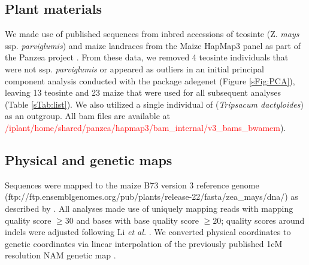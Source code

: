 \documentclass{pnastwo}
\newcommand{\jri}[1]{\textcolor{red}{\scriptsize #1}}
\begin{document}
\begin{article}
\begin{materials}
\subsection{Plant materials}
We made use of published sequences from inbred accessions of teosinte (Z. \emph{mays} ssp. \emph{parviglumis}) and maize landraces from the Maize HapMap3 panel as part of the Panzea project  \cite{chia2012, lemmon2014, hapmap3}. 
From these data, we removed 4 teosinte individuals that were not ssp. \emph{parviglumis} or appeared as outliers in an initial principal component analysis conducted with the package adegenet \cite{jombart2011} (Figure \ref{sFig:PCA}), leaving 13 teosinte and 23 maize that were used for all subsequent analyses (Table \ref{sTab:list}). We also utilized a single individual of (\emph{Tripsacum dactyloides}) as an outgroup.  All bam files are available at \textcolor{red}{/iplant/home/shared/panzea/hapmap3/bam\_internal/v3\_bams\_bwamem}).



\subsection{Physical and genetic maps}
Sequences were mapped to the maize B73 version 3 reference genome \cite{schnable2009} (ftp://ftp.ensemblgenomes.org/pub/plants/release-22/fasta/zea\_mays/dna/) as described by \cite{hapmap3}. All analyses made use of uniquely mapping reads with mapping quality score $\geq  30$ and bases with base quality score $\geq 20$; quality scores around indels were adjusted following Li \emph{et al.} \cite{li2011statistical}.
We converted physical coordinates to genetic coordinates via linear interpolation of the previously published 1cM resolution NAM genetic map \cite{glaubitz2014}. 


\end{materials}
\end{article}
\end{document}

